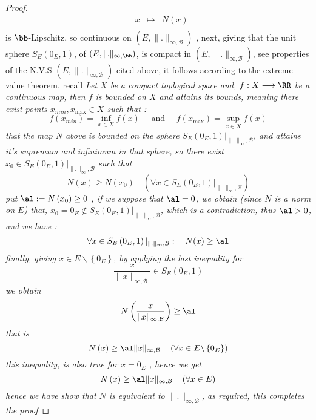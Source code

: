 \begin{proof}
\[\begin{array}{cccc}
           &  x  & \longmapsto     & N(x)  \\ 
\end{array}
\]
is $\bb $-Lipschitz, so continuous on $\left( E, \| . \| _{\infty, \mathcal{B}  } \right)$ 
, next, giving that the unit sphere $S_{E}\left( 0_{E},1 \right)$, of 
$\left( E, \| . \| _{\infty ,\bb } \right)$, is compact in 
$\left( E, \| . \| _{\infty ,\mathcal{B} } \right)$, see properties of the N.V.S
$\left( E,\| . \| _{\infty ,\mathcal{B} } \right)$  cited above, it follows
according to the extreme value theorem, recall 
\divider
\it
Let $X$ be a compact toplogical space and, 
$ f : X \longrightarrow \RR  $ be a continuous map, then 
$f$ is bounded on $X$ and attains its bounds, meaning there exist 
points $x_{min}, x_{\max } \in X$ such that : 
\[
f \left( x_{min} \right) = 
\inf_{x \in X} f(x)  \quad 
\text{ and } \quad 
f(x_{\max })  = \sup_{x \in X}  f(x) 
\]
\divider
\normalfont
that the map $N$ above is bounded on the sphere $S_{E} \left( 
0_{E},1\right)|_{\| . \|_{\infty }, \mathcal{B}}$, and attains 
it's supremum and infinimum in that sphere, so there exist
$x_0 \in S_{E}\left( 0_{E},1 \right)|_{\| . \| _{\infty },\mathcal{B} }$  
such that  
\[
N \left( x \right) \geq N(x_0) \quad 
\left( \forall  x \in S_{E} \left( 0_{E},1 \right)|_{\| . \|_{\infty },\mathcal{B} }
\right)
\]
put $\al := N \left( x_0 \right) \geq 0$ , if we suppose that $\al = 0$, 
we obtain (since $N$ is a norm on $E$) that, 
$x_0 = 0_{E} \notin  S_{E} \left( 0_{E},1 \right)|_{\| . \| _{\infty },
\mathcal{B} }$, which is a contradiction, thus 
$\al > 0$, and we have : 
\[
\forall  x \in S_{E} \left( 0_{E},1 \right)|_{\| . \| _{\infty },\mathcal{B} } 
:
\quad 
N (x)  \geq \al
\]
finally, giving $x \in E \backslash \left\{ 0_{E} \right\}$, by 
applying the last inequality for 
\[
\frac{x}{\| x \| _{\infty ,\mathcal{B} }} 
\in  S_{E} \left( 0_{E},1 \right)
\]
we obtain 
\[
N \left( \frac{x}{\| x \| _{\infty ,\mathcal{B} }} \right) 
\geq  \al
\]
that is 
\[
N \left( x \right) \geq \al \| x \| _{\infty ,\mathcal{B} } 
\quad \left( \forall  x \in E \backslash \left\{ 0_{E} \right\} \right)
\]
this inequality, is also true for $x = 0_{E}$ , hence we get 
\[
N \left( x \right) \geq \al \| x \| _{\infty ,\mathcal{B} } 
\quad  \left( \forall  x \in E \right)
\]
hence we have show that $N$ is equivalent to $\| . \|_{\infty , \mathcal{B} } $,
as required, this completes the proof
\end{proof}

